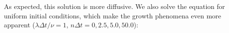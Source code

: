 \documentclass[12pt]{article}
\begin{document}
\noindent As expected, this solution is more diffusive. We also solve the equation for uniform initial conditions, which make the growth phenomena even more apparent ($\lambda \Delta t/\nu = 1$, $n\Delta t = 0, 2.5, 5.0, 50.0$):
\begin{figure}[H]
\end{figure}
\end{document}
